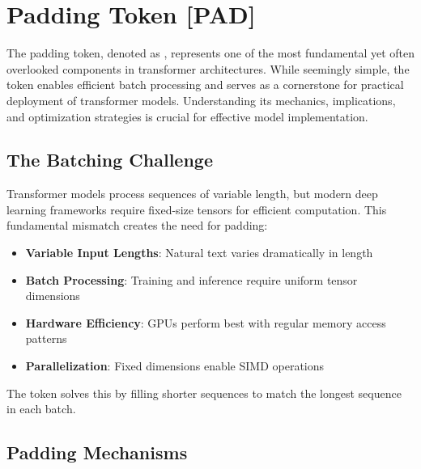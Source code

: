 \section{Padding Token [PAD]}

The padding token, denoted as \pad{}, represents one of the most fundamental yet often overlooked components in transformer architectures. While seemingly simple, the \pad{} token enables efficient batch processing and serves as a cornerstone for practical deployment of transformer models. Understanding its mechanics, implications, and optimization strategies is crucial for effective model implementation.

\subsection{The Batching Challenge}

Transformer models process sequences of variable length, but modern deep learning frameworks require fixed-size tensors for efficient computation. This fundamental mismatch creates the need for padding:

\begin{itemize}
\item \textbf{Variable Input Lengths}: Natural text varies dramatically in length
\item \textbf{Batch Processing}: Training and inference require uniform tensor dimensions
\item \textbf{Hardware Efficiency}: GPUs perform best with regular memory access patterns
\item \textbf{Parallelization}: Fixed dimensions enable SIMD operations
\end{itemize}

The \pad{} token solves this by filling shorter sequences to match the longest sequence in each batch.

\subsection{Padding Mechanisms}

